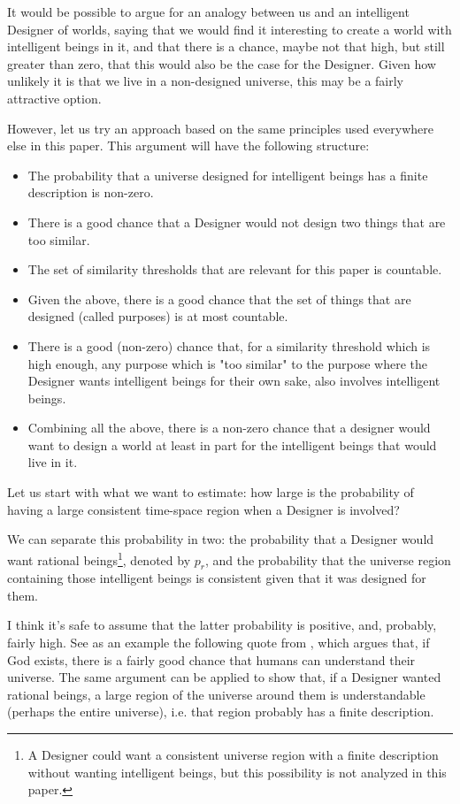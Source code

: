 \documentclass[a4paper
,draft
]{article}
\newcommand{\paper}[1]{paper}
\begin{document}
It would be possible to argue for an analogy between us and
an intelligent Designer of worlds, saying that we would find it interesting
to create a world with intelligent beings in it, and that there is a chance,
maybe not that high, but still greater than zero, that this would also be
the case for the Designer.
Given how unlikely it is that we live in a non-designed universe, this may be
a fairly attractive option.

However, let us try an approach based on the same principles used everywhere
else in this \paper{}.
This argument will have the following structure:
\begin{itemize}
  \item The probability that a universe designed for intelligent beings
        has a finite description is non-zero.
  \item There is a good chance that a Designer would not design two things
        that are too similar.
  \item The set of similarity thresholds that are relevant for this paper is
        countable.
  \item Given the above, there is a good chance that the set of things that
        are designed (called purposes) is at most countable.
  \item There is a good (non-zero) chance that, for a similarity threshold
        which is high enough,
        any purpose which is "too similar" to the purpose where the Designer
        wants intelligent beings for their own sake, also involves intelligent
        beings.
  \item Combining all the above, there is a non-zero chance that a designer
        would want to design a world at least in part for the intelligent
        beings that would live in it.
\end{itemize}

Let us start with what we want to estimate:
how large is the probability of having
a large consistent time-space region when a Designer is involved?

We can separate this probability in two: the probability that a Designer
would want rational beings\footnote{A Designer could want a consistent universe
region with a finite
description without wanting intelligent beings, but this possibility is not
analyzed in this paper.}, denoted by $p_r$, and
the probability that the universe region containing
those intelligent beings is consistent
given that it was designed for them.

I think it's safe to assume that the latter probability is positive,
and, probably, fairly high. See as an example the following quote from
\textcite{Swinburne2003}, which argues that, if God exists,
there is a fairly good chance that humans can understand their universe.
The same argument can be applied to show that, if a Designer wanted
rational beings, a large region of the universe around them is understandable
(perhaps the entire universe), i.e. that region probably has a finite
description.
\end{document}
